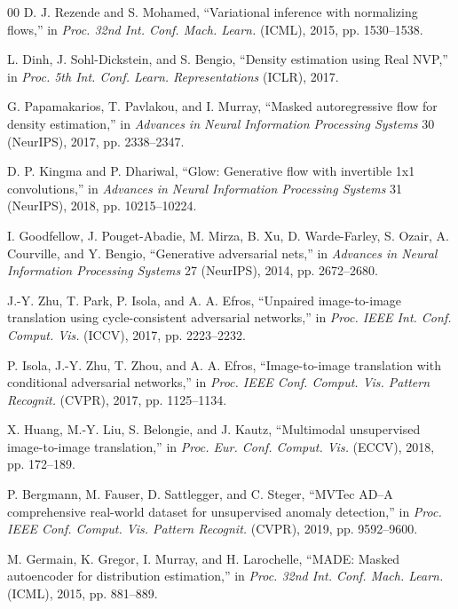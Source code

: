 \documentclass[conference]{IEEEtran}
\begin{document}
\begin{thebibliography}{00}
 D. J. Rezende and S. Mohamed, ``Variational inference with normalizing flows,'' in \emph{Proc. 32nd Int. Conf. Mach. Learn.} (ICML), 2015, pp. 1530--1538.

 L. Dinh, J. Sohl-Dickstein, and S. Bengio, ``Density estimation using Real NVP,'' in \emph{Proc. 5th Int. Conf. Learn. Representations} (ICLR), 2017.

 G. Papamakarios, T. Pavlakou, and I. Murray, ``Masked autoregressive flow for density estimation,'' in \emph{Advances in Neural Information Processing Systems} 30 (NeurIPS), 2017, pp. 2338--2347.

 D. P. Kingma and P. Dhariwal, ``Glow: Generative flow with invertible 1x1 convolutions,'' in \emph{Advances in Neural Information Processing Systems} 31 (NeurIPS), 2018, pp. 10215--10224.

 I. Goodfellow, J. Pouget-Abadie, M. Mirza, B. Xu, D. Warde-Farley, S. Ozair, A. Courville, and Y. Bengio, ``Generative adversarial nets,'' in \emph{Advances in Neural Information Processing Systems} 27 (NeurIPS), 2014, pp. 2672--2680.

 J.-Y. Zhu, T. Park, P. Isola, and A. A. Efros, ``Unpaired image-to-image translation using cycle-consistent adversarial networks,'' in \emph{Proc. IEEE Int. Conf. Comput. Vis.} (ICCV), 2017, pp. 2223--2232.

 P. Isola, J.-Y. Zhu, T. Zhou, and A. A. Efros, ``Image-to-image translation with conditional adversarial networks,'' in \emph{Proc. IEEE Conf. Comput. Vis. Pattern Recognit.} (CVPR), 2017, pp. 1125--1134.

 X. Huang, M.-Y. Liu, S. Belongie, and J. Kautz, ``Multimodal unsupervised image-to-image translation,'' in \emph{Proc. Eur. Conf. Comput. Vis.} (ECCV), 2018, pp. 172--189.

 P. Bergmann, M. Fauser, D. Sattlegger, and C. Steger, ``MVTec AD--A comprehensive real-world dataset for unsupervised anomaly detection,'' in \emph{Proc. IEEE Conf. Comput. Vis. Pattern Recognit.} (CVPR), 2019, pp. 9592--9600.

 M. Germain, K. Gregor, I. Murray, and H. Larochelle, ``MADE: Masked autoencoder for distribution estimation,'' in \emph{Proc. 32nd Int. Conf. Mach. Learn.} (ICML), 2015, pp. 881--889.
\end{thebibliography}
\end{document}
